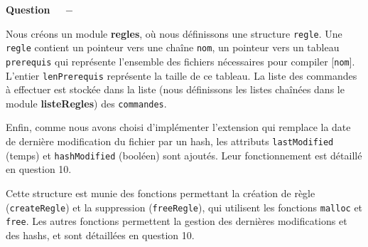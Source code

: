 \documentclass[11pt]{article}
\newcounter{question}[section]
\newenvironment{question}[1][]{\refstepcounter{question}\par\medskip
   \noindent\textbf{Question~\thequestion ~ $-$} \rmfamily}{}
\begin{document}
\begin{question} %

Nous créons un module \textbf{regles}, où nous définissons une structure \texttt{regle}. Une \texttt{regle} contient un pointeur vers une chaîne \texttt{nom}, un pointeur vers un tableau \texttt{prerequis} qui représente l'ensemble des fichiers nécessaires pour compiler [\texttt{nom}]. L'entier \texttt{lenPrerequis} représente la taille de ce tableau. La liste des commandes à effectuer est stockée dans la liste (nous définissons les listes chaînées dans le module \textbf{listeRegles}) des \texttt{commandes}.

Enfin, comme nous avons choisi d'implémenter l'extension qui remplace la date de dernière modification du fichier par un hash, les attributs \texttt{lastModified} (temps) et \texttt{hashModified} (booléen) sont ajoutés. Leur fonctionnement est détaillé en question 10.


Cette structure est munie des fonctions permettant la création de règle (\texttt{createRegle}) et la suppression (\texttt{freeRegle}), qui utilisent les fonctions \texttt{malloc} et \texttt{free}. Les autres fonctions permettent la gestion des dernières modifications et des hashs, et sont détaillées en question 10.

\end{question}
\end{document}
